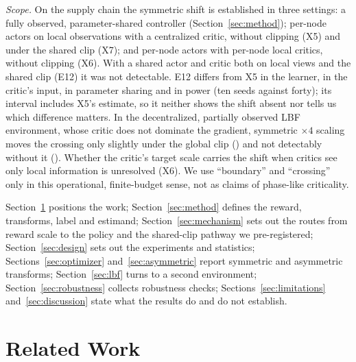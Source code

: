 \emph{Scope.} On the supply chain the symmetric shift is established in three settings: a fully observed,
parameter-shared controller (Section~\ref{sec:method}); per-node actors on local observations with a centralized
critic, without clipping (X5) and under the shared clip (X7); and per-node actors with per-node local critics, without
clipping (X6). With a shared actor and critic both on local views and the shared clip (E12) it was not detectable. E12
differs from X5 in the learner, in the critic's input, in parameter sharing and in power (ten seeds against forty);
its interval includes X5's estimate, so it neither shows the shift absent nor tells us which difference matters. In the decentralized,
partially observed LBF environment, whose critic does not dominate the gradient, symmetric $\times4$ scaling moves the
crossing only slightly under the global clip (\VfourLBFSymGlobal{}) and not detectably without it (\VfourLBFSymSep{}).
Whether the critic's target scale carries the shift when critics see only local information is unresolved (X6).
We use ``boundary'' and ``crossing'' only in this operational, finite-budget sense, not as claims of
phase-like criticality.

Section~\ref{sec:related} positions the work; Section~\ref{sec:method} defines the reward, transforms,
label and estimand; Section~\ref{sec:mechanism} sets out the routes from reward scale to the policy and the
shared-clip pathway we pre-registered;
Section~\ref{sec:design} sets out the experiments and statistics; Sections~\ref{sec:optimizer}
and~\ref{sec:asymmetric} report symmetric and asymmetric transforms; Section~\ref{sec:lbf} turns to a second
environment; Section~\ref{sec:robustness} collects robustness checks; Sections~\ref{sec:limitations}
and~\ref{sec:discussion} state what the results do and do not establish.


\section{Related Work}
\label{sec:related}

